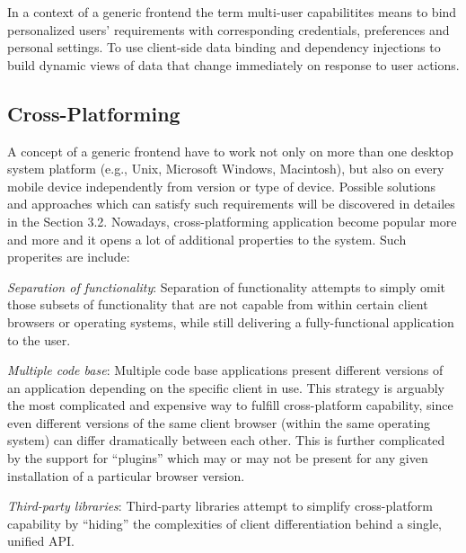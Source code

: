 	In a context of a generic frontend the term multi-user capabilitites means to bind personalized users' requirements with corresponding credentials, preferences and personal settings. To use client-side data binding and dependency injections to build dynamic views of data that change immediately on response to user actions.

\subsection {Cross-Platforming}
    A concept of a generic frontend have to work not only on more than one desktop system platform (e.g., Unix, Microsoft Windows, Macintosh), but also on every mobile device independently from version or type of device. Possible solutions and approaches which can satisfy such requirements will be discovered in detailes in the Section 3.2. Nowadays, cross-platforming application become popular more and more and it opens a lot of additional properties to the system. Such properites are include:

	\emph{Separation of functionality}:	Separation of functionality attempts to simply omit those subsets of functionality that are not capable from within certain client browsers or operating systems, while still delivering a fully-functional application to the user.

	\emph{Multiple code base}: Multiple code base applications present different versions of an application depending on the specific client in use. This strategy is arguably the most complicated and expensive way to fulfill cross-platform capability, since even different versions of the same client browser (within the same operating system) can differ dramatically between each other. This is further complicated by the support for ``plugins'' which may or may not be present for any given installation of a particular browser version.

	\emph{Third-party libraries}: Third-party libraries attempt to simplify cross-platform capability by ``hiding'' the complexities of client differentiation behind a single, unified API.

